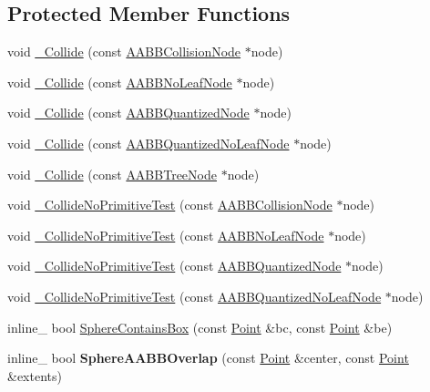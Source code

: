 \subsection*{Protected Member Functions}
\begin{DoxyCompactItemize}
\item 
void \hyperlink{classOpcode_1_1SphereCollider_a87e6d2c389bbec6bc24400eb09912232}{\+\_\+\+Collide} (const \hyperlink{classOpcode_1_1AABBCollisionNode}{A\+A\+B\+B\+Collision\+Node} $\ast$node)
\item 
void \hyperlink{classOpcode_1_1SphereCollider_a0e73ee33d0eaefc60fe8b756cedb7117}{\+\_\+\+Collide} (const \hyperlink{classOpcode_1_1AABBNoLeafNode}{A\+A\+B\+B\+No\+Leaf\+Node} $\ast$node)
\item 
void \hyperlink{classOpcode_1_1SphereCollider_a9e313ae0980c136b19c0bde2724dfde6}{\+\_\+\+Collide} (const \hyperlink{classOpcode_1_1AABBQuantizedNode}{A\+A\+B\+B\+Quantized\+Node} $\ast$node)
\item 
void \hyperlink{classOpcode_1_1SphereCollider_a3a58245a95a724018734c4039ac76a9e}{\+\_\+\+Collide} (const \hyperlink{classOpcode_1_1AABBQuantizedNoLeafNode}{A\+A\+B\+B\+Quantized\+No\+Leaf\+Node} $\ast$node)
\item 
void \hyperlink{classOpcode_1_1SphereCollider_a41d72752c6d07889c74763b86fd9d4f8}{\+\_\+\+Collide} (const \hyperlink{classOpcode_1_1AABBTreeNode}{A\+A\+B\+B\+Tree\+Node} $\ast$node)
\item 
void \hyperlink{classOpcode_1_1SphereCollider_a6a83fc6aa69d9b89b979da433aa26acd}{\+\_\+\+Collide\+No\+Primitive\+Test} (const \hyperlink{classOpcode_1_1AABBCollisionNode}{A\+A\+B\+B\+Collision\+Node} $\ast$node)
\item 
void \hyperlink{classOpcode_1_1SphereCollider_a21c5701914a94187121940781bca8858}{\+\_\+\+Collide\+No\+Primitive\+Test} (const \hyperlink{classOpcode_1_1AABBNoLeafNode}{A\+A\+B\+B\+No\+Leaf\+Node} $\ast$node)
\item 
void \hyperlink{classOpcode_1_1SphereCollider_ae92449297f94e2edd2ac463befbfcdf0}{\+\_\+\+Collide\+No\+Primitive\+Test} (const \hyperlink{classOpcode_1_1AABBQuantizedNode}{A\+A\+B\+B\+Quantized\+Node} $\ast$node)
\item 
void \hyperlink{classOpcode_1_1SphereCollider_a9a17662f7c12c190bcf996329019e3af}{\+\_\+\+Collide\+No\+Primitive\+Test} (const \hyperlink{classOpcode_1_1AABBQuantizedNoLeafNode}{A\+A\+B\+B\+Quantized\+No\+Leaf\+Node} $\ast$node)
\item 
inline\+\_\+ bool \hyperlink{classOpcode_1_1SphereCollider_af91e473c490bf39e08cb19da4b1c761a}{Sphere\+Contains\+Box} (const \hyperlink{classOpcode_1_1Point}{Point} \&bc, const \hyperlink{classOpcode_1_1Point}{Point} \&be)
\item 
inline\+\_\+ bool {\bfseries Sphere\+A\+A\+B\+B\+Overlap} (const \hyperlink{classOpcode_1_1Point}{Point} \&center, const \hyperlink{classOpcode_1_1Point}{Point} \&extents)\hypertarget{classOpcode_1_1SphereCollider_a91ee9ba5e56693d489ffe5b636bbef5a}{}\label{classOpcode_1_1SphereCollider_a91ee9ba5e56693d489ffe5b636bbef5a}


\end{DoxyCompactItemize}
